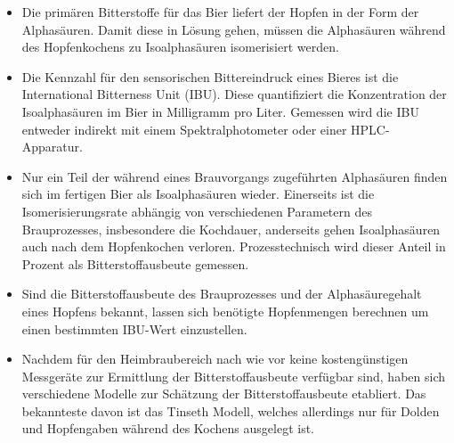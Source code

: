 \documentclass[a4paper,parskip=half]{scrartcl}
\begin{document}
\begin{itemize}
\item Die primären Bitterstoffe für das Bier liefert der Hopfen in der Form der Alphasäuren. Damit diese in Lösung gehen, müssen die Alphasäuren während des Hopfenkochens zu Isoalphasäuren isomerisiert werden.
   
\item Die Kennzahl für den sensorischen Bittereindruck eines Bieres ist die International Bitterness Unit (IBU). Diese quantifiziert die Konzentration der Isoalphasäuren im Bier in Milligramm pro Liter. Gemessen wird die IBU entweder indirekt mit einem Spektralphotometer oder einer HPLC-Apparatur.

\item Nur ein Teil der während eines Brauvorgangs zugeführten Alphasäuren finden sich im fertigen Bier als Isoalphasäuren wieder. Einerseits ist die Isomerisierungsrate abhängig von verschiedenen Parametern des Brauprozesses, insbesondere die Kochdauer, anderseits gehen Isoalphasäuren auch nach dem Hopfenkochen verloren. Prozesstechnisch wird dieser Anteil in Prozent als Bitterstoffausbeute gemessen.

\item Sind die Bitterstoffausbeute des Brauprozesses und der Alphasäuregehalt eines Hopfens bekannt, lassen sich benötigte Hopfenmengen berechnen um einen bestimmten IBU-Wert einzustellen.

\item Nachdem für den Heimbraubereich nach wie vor keine kostengünstigen Messgeräte zur Ermittlung der Bitterstoffausbeute verfügbar sind, haben sich verschiedene Modelle zur Schätzung der Bitterstoffausbeute etabliert. Das bekannteste davon ist das Tinseth Modell, welches allerdings nur für Dolden und Hopfengaben während des Kochens ausgelegt ist.
\end{itemize}

\printbibliography[title=Quellen]
\end{document}
